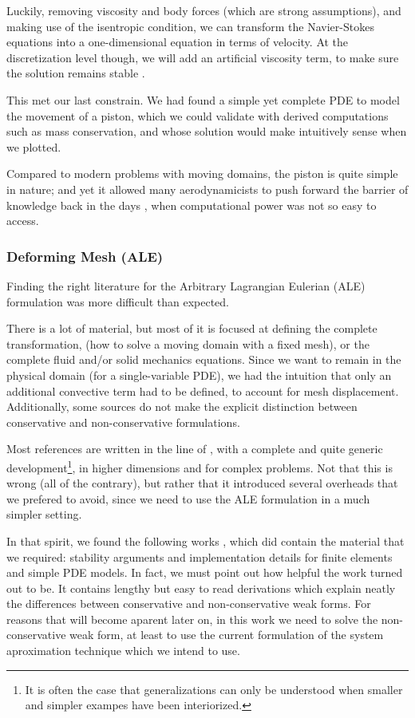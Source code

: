 \documentclass[literature_review.tex]{subfiles}
\begin{document}
Luckily, removing viscosity and body forces (which are strong assumptions), 
and making use of the isentropic condition,
we can transform the Navier-Stokes equations 
into a one-dimensional equation \cite{1860_Earnshow, nonlinearDiffusiveWaves}
in terms of velocity.
At the discretization level though, 
we will add an artificial viscosity term,
to make sure the solution remains stable \cite{2011_artificialViscosityPOD}.

This met our last constrain. 
We had found a simple yet complete PDE to model the movement of a piston, 
which we could validate with derived computations such as mass conservation,
and whose solution would make intuitively sense when we plotted.

Compared to modern problems with moving domains,
the piston is quite simple in nature;
and yet it allowed many aerodynamicists to push forward the barrier of knowledge 
back in the days \cite{1956_PistonTheoryNewAerodynamicTool},
when computational power was not so easy to access. 

\subsubsection{Deforming Mesh (ALE)}
\label{sec:literature_review_deforming_mesh}
Finding the right literature for the Arbitrary Lagrangian Eulerian (ALE) formulation 
was more difficult than expected.

There is a lot of material, 
but most of it is focused at defining the complete transformation,
(how to solve a moving domain with a fixed mesh),
or the complete fluid and/or solid mechanics equations.
Since we want to remain in the physical domain
(for a \mbox{single-variable} PDE),
we had the intuition that only
an additional convective term had to be defined, 
to account for mesh displacement.
Additionally, some sources do not make the explicit distinction between
conservative and non-conservative formulations.

Most references are written in the line of 
\cite{doneaALE,
DONEA1982689},
with a complete and quite generic development\footnote{
    It is often the case that generalizations can only be understood
    when smaller and simpler exampes have been interiorized.
}, 
in higher dimensions and for complex problems.
Not that this is wrong 
(all of the contrary), 
but rather that it introduced several overheads that we prefered to avoid,
since we need to use the ALE formulation in a much simpler setting.

In that spirit, 
we found the following works 
\cite{formaggiaALE,
formaggiaALE_secondOrder,
FSIPistonProblem},
which did contain the material that we required:
stability arguments and implementation details for finite elements
and simple PDE models.
In fact, we must point out how helpful the work \cite{formaggiaALE}
turned out to be.
It contains lengthy but easy to read derivations which explain neatly
the differences between conservative and non-conservative weak forms.
For reasons that will become aparent later on,
in this work we need to solve the non-conservative weak form,
at least to use the current formulation of the system aproximation technique which 
we intend to use.
\end{document}
